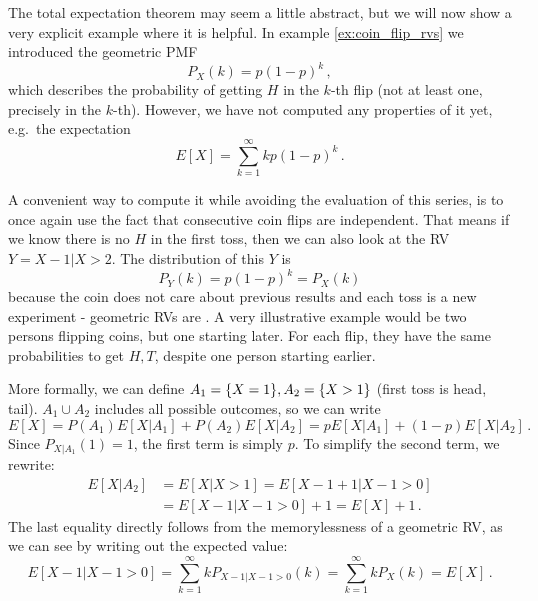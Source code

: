 \begin{ex}[Memorylessness]
The total expectation theorem may seem a little abstract, but we will now show a very explicit example where it is helpful. In example \ref{ex:coin_flip_rvs} we introduced the geometric PMF
\begin{equation*}
P_X(k) = p (1 - p)^k \, ,
\end{equation*}
which describes the probability of getting $H$ in the $k$-th flip (not at least one, precisely in the $k$-th). However, we have not computed any properties of it yet, e.g.~the expectation
\begin{equation*}
E[X] = \sum_{k = 1}^\infty k p (1 - p)^k \, .
\end{equation*}

A convenient way to compute it while avoiding the evaluation of this series, is to once again use the fact that consecutive coin flips are independent. That means if we know there is no $H$ in the first toss, then we can also look at the RV $Y = X - 1 | X > 2$. The distribution of this $Y$ is
\begin{equation*}
P_Y(k) = p (1 - p)^k  = P_X(k)
\end{equation*}
because the coin does not care about previous results and each toss is a new experiment - geometric RVs are . A very illustrative example would be two persons flipping coins, but one starting later. For each flip, they have the same probabilities to get $H, T$, despite one person starting earlier.%

More formally, we can define $A_1 = \qty{X = 1}, A_2 = \qty{X > 1}$ (first toss is head, tail). $A_1 \cup A_2$ includes all possible outcomes, so we can write
\begin{equation*}
E[X] = P(A_1) E[X | A_1] + P(A_2) E[X | A_2] = p E[X | A_1] + (1 - p) E[X | A_2] \, .
\end{equation*}
Since $P_{X | A_1}(1) = 1$, the first term is simply $p$. To simplify the second term, we rewrite:
\begin{align*}
E[X | A_2] &= E[X | X > 1] = E[X - 1 + 1 | X - 1 > 0]
\\
&= E[X - 1 | X - 1 > 0] + 1 = E[X] + 1 \, .
\end{align*}
The last equality directly follows from the memorylessness of a geometric RV, as we can see by writing out the expected value:
\begin{equation*}
E[X - 1 | X - 1 > 0] = \sum_{k = 1}^\infty k P_{X - 1 | X - 1 > 0}(k) = \sum_{k = 1}^\infty k P_X(k) = E[X] \, .
\end{equation*}


\end{ex}

